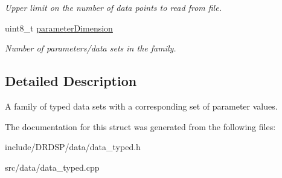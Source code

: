 \begin{DoxyCompactItemize}
\begin{DoxyCompactList}\small\item\em Upper limit on the number of data points to read from file. \end{DoxyCompactList}\item 
\hypertarget{struct_d_r_d_s_p_1_1_data_system_typed_af3b60c8a97dc029652d551b7cdd34be4}{uint8\-\_\-t \hyperlink{struct_d_r_d_s_p_1_1_data_system_typed_af3b60c8a97dc029652d551b7cdd34be4}{parameter\-Dimension}}\label{struct_d_r_d_s_p_1_1_data_system_typed_af3b60c8a97dc029652d551b7cdd34be4}

\begin{DoxyCompactList}\small\item\em Number of parameters/data sets in the family. \end{DoxyCompactList}\end{DoxyCompactItemize}


\subsection{Detailed Description}
A family of typed data sets with a corresponding set of parameter values. 

The documentation for this struct was generated from the following files\-:\begin{DoxyCompactItemize}
\item 
include/\-D\-R\-D\-S\-P/data/data\-\_\-typed.\-h\item 
src/data/data\-\_\-typed.\-cpp\end{DoxyCompactItemize}
